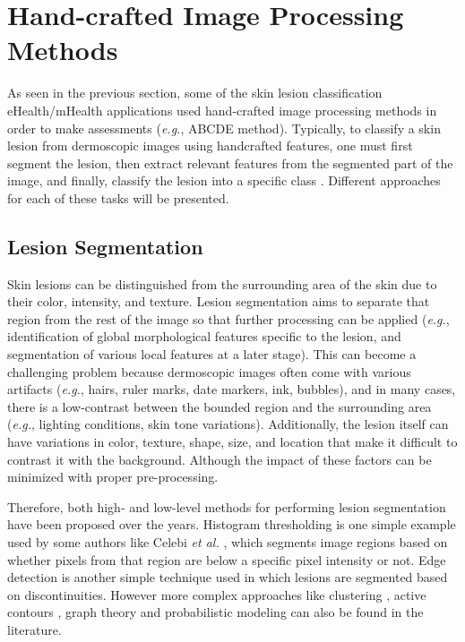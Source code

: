 \section{Hand-crafted Image Processing Methods}
\label{section:hand-crafted}
    As seen in the previous section, some of the skin lesion classification eHealth/mHealth applications used hand-crafted image processing methods in order to make assessments (\textit{e.g.}, ABCDE method). Typically, to classify a skin lesion from dermoscopic images using handcrafted features, one must first segment the lesion, then extract relevant features from the segmented part of the image, and finally, classify the lesion into a specific class \cite{Pathan2018}. Different approaches for each of these tasks will be presented. \par
    
    \subsection{Lesion Segmentation}
    Skin lesions can be distinguished from the surrounding area of the skin due to their color, intensity, and texture. Lesion segmentation aims to separate that region from the rest of the image so that further processing can be applied (\textit{e.g.}, identification of global morphological features specific to the lesion, and segmentation of various local features at a later stage). This can become a challenging problem because dermoscopic images often come with various artifacts (\textit{e.g.}, hairs, ruler marks, date markers, ink, bubbles), and in many cases, there is a low-contrast between the bounded region and the surrounding area (\textit{e.g.}, lighting conditions, skin tone variations). Additionally, the lesion itself can have variations in color, texture, shape, size, and location that make it difficult to contrast it with the background. Although the impact of these factors can be minimized with proper pre-processing. \par
    
    Therefore, both high- and low-level methods for performing lesion segmentation have been proposed over the years. Histogram thresholding is one simple example used by some authors like Celebi \textit{et al.} \cite{EmreCelebi2013}, which segments image regions based on whether pixels from that region are below a specific pixel intensity or not. Edge detection is another simple technique used \cite{Abbas2011} in which lesions are segmented based on discontinuities. However more complex approaches like clustering \cite{Mete2011}, active contours \cite{Zhou2013}, graph theory \cite{Yuan2009} and probabilistic modeling \cite{Wong2011} can also be found in the literature. \par
    
